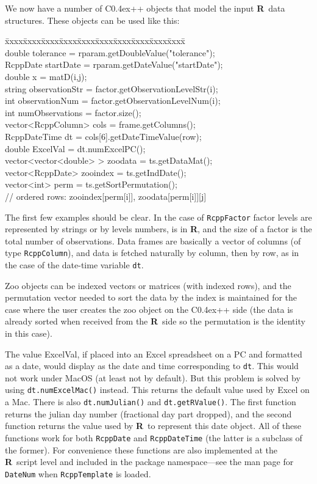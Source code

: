 \documentclass{article}
\newenvironment{program}{\ttfamily\begin{tabbing}
\=xxxx\=xxxx\=xxxx\=xxxx\=xxxx\=xxxx\=xxxx\=xxxx\=xxxx\=xxxx\= \+ \kill \\
}{\end{tabbing}}
\def\C++{C{\raise 0.4ex\hbox{\tiny ++}}}
\newcommand{\R}{{\bf R}}
\begin{document}
We now have a number of \C++ objects that model the
input \R\ data structures. These objects can be used like this:
\begin{program}
\>\> double tolerance = rparam.getDoubleValue("tolerance");\\
\>\> RcppDate startDate = rparam.getDateValue("startDate");\\
\>\> double x = matD(i,j);\\
\>\> string observationStr = factor.getObservationLevelStr(i);\\
\>\> int observationNum = factor.getObservationLevelNum(i);\\
\>\> int numObservations = factor.size();\\
\>\> vector<RcppColumn> cols = frame.getColumns();\\
\>\> RcppDateTime dt = cols[6].getDateTimeValue(row);\\
\>\> double ExcelVal = dt.numExcelPC();\\
\>\> vector<vector<double> > zoodata = ts.getDataMat();\\
\>\> vector<RcppDate> zooindex = ts.getIndDate();\\
\>\> vector<int> perm = ts.getSortPermutation(); \\
\>\> // ordered rows: zooindex[perm[i]], zoodata[perm[i]][j]
\end{program}

The first few examples should be clear. In the case of {\tt RcppFactor}
factor levels are represented by strings or by levels numbers, is in
\R, and the size of a factor is the total number of observations.
Data frames are basically a vector of columns (of type {\tt RcppColumn}),
and data is fetched naturally by column, then by row, as in the case
of the date-time variable {\tt dt}.

Zoo objects can be indexed vectors or matrices (with indexed rows),
and the permutation vector needed to sort the data by the index is
maintained for the case where the user creates the zoo object on the
\C++ side (the data is already sorted when received from the \R\ side
so the permutation is the identity in this case).

The value ExcelVal, if placed into an Excel spreadsheet on a PC 
and formatted as
a date, would display as the date and time corresponding to {\tt dt}. 
This would
not work under MacOS (at least not by default). But this problem is
solved by using {\tt dt.numExcelMac()} instead. This returns the
default value used by Excel on a Mac. There is also
{\tt dt.numJulian()} and {\tt dt.getRValue()}. The first function
returns the julian day number (fractional day part dropped), and the second
function returns the value used by \R\ to represent this date object. All
of these functions work for both {\tt RcppDate} and {\tt RcppDateTime} (the
latter is a subclass of the former). For convenience these functions
are also
implemented at the \R\ script level and included in the package 
namespace---see the man page for {\tt DateNum} when {\tt RcppTemplate} is
loaded.
\end{document}
